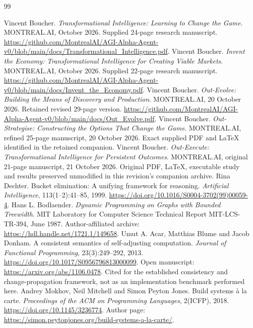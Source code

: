 \documentclass[11pt,letterpaper]{article}
\theoremstyle{definition}\newtheorem{definition}[theorem]{Definition}
\theoremstyle{remark}\newtheorem{remark}[theorem]{Remark}
\begin{document}
\clearpage
\begin{thebibliography}{99}
\small\raggedright\setlength{\itemsep}{.4em}
Vincent Boucher. \emph{Transformational Intelligence: Learning to Change the Game}. MONTREAL.AI, October 2026. Supplied 24-page research manuscript. \url{https://github.com/MontrealAI/AGI-Alpha-Agent-v0/blob/main/docs/Transformational_Intelligence.pdf}.
Vincent Boucher. \emph{Invent the Economy: Transformational Intelligence for Creating Viable Markets}. MONTREAL.AI, October 2026. Supplied 22-page research manuscript. \url{https://github.com/MontrealAI/AGI-Alpha-Agent-v0/blob/main/docs/Invent_the_Economy.pdf}.
Vincent Boucher. \emph{Out-Evolve: Building the Means of Discovery and Production}. MONTREAL.AI, 20 October 2026. Retained revised 29-page version. \url{https://github.com/MontrealAI/AGI-Alpha-Agent-v0/blob/main/docs/Out_Evolve.pdf}.
Vincent Boucher. \emph{Out-Strategise: Constructing the Options That Change the Game}. MONTREAL.AI, refined 25-page manuscript, 20 October 2026. Exact supplied PDF and LaTeX identified in the retained companion.
Vincent Boucher. \emph{Out-Execute: Transformational Intelligence for Persistent Outcomes}. MONTREAL.AI, original 21-page manuscript, 21 October 2026. Original PDF, LaTeX, executable study and results preserved unmodified in this revision's companion archive.
Rina Dechter. Bucket elimination: A unifying framework for reasoning. \emph{Artificial Intelligence}, 113(1--2):41--85, 1999. \url{https://doi.org/10.1016/S0004-3702(99)00059-4}.
Hans L. Bodlaender. \emph{Dynamic Programming on Graphs with Bounded Treewidth}. MIT Laboratory for Computer Science Technical Report MIT-LCS-TR-394, June 1987. Author-affiliated archive: \url{https://hdl.handle.net/1721.1/149658}.
Umut A. Acar, Matthias Blume and Jacob Donham. A consistent semantics of self-adjusting computation. \emph{Journal of Functional Programming}, 23(3):249--292, 2013. \url{https://doi.org/10.1017/S0956796813000099}. Open manuscript: \url{https://arxiv.org/abs/1106.0478}. Cited for the established consistency and change-propagation framework, not as an implementation benchmark performed here.
Andrey Mokhov, Neil Mitchell and Simon Peyton Jones. Build systems à la carte. \emph{Proceedings of the ACM on Programming Languages}, 2(ICFP), 2018. \url{https://doi.org/10.1145/3236774}. Author page: \url{https://simon.peytonjones.org/build-systems-a-la-carte/}.

\end{thebibliography}
\end{document}
